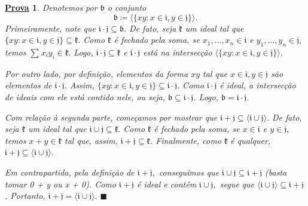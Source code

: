 \documentclass{article}
\newtheorem*{proof*}{\underline{Prova}}
\renewcommand\qedsymbol{$\blacksquare$}
\begin{document}
\begin{proof*}
  Denotemos por \(\mathfrak{b}\) o conjunto 
  \[
    \mathfrak{b}\coloneqq \langle \{xy:x\in \mathfrak{i}, y\in \mathfrak{j}\} \rangle.
  \]
  Primeiramente, note que \(\mathfrak{i}\cdot \mathfrak{j}\subseteq{\mathfrak{b}}.\) De fato, seja \(\mathfrak{k}\) um ideal tal que \(\{xy:x\in \mathfrak{i}, y\in \mathfrak{j}\}\subseteq{\mathfrak{k}}.\)
  Como \(\mathfrak{k}\) é fechado pela soma, se \(x_{1}, \dotsc, x_{n}\in \mathfrak{i}\) e \(y_{1},\dotsc,y_{n}\in \mathfrak{j},\) temos  
  \(\sum\limits_{}^{}x_{i}y_{i}\in \mathfrak{k}.\) Logo, \(\mathfrak{i}\cdot \mathfrak{j}\subseteq{\mathfrak{k}}\) e \(\mathfrak{i}\cdot \mathfrak{j}\) está
  na intersecção \(\langle \{xy: x\in \mathfrak{i}, y\in \mathfrak{j}\} \rangle.\)

  Por outro lado, por definição, elementos da forma \(xy\) tal que \(x\in \mathfrak{i}, y\in \mathfrak{j}\) são elementos
  de \(\mathfrak{i}\cdot \mathfrak{j}.\) Assim, \(\{xy:x\in \mathfrak{i}, y\in \mathfrak{j}\}\subseteq{\mathfrak{i}\cdot \mathfrak{j}}.\) Como
  \(\mathfrak{i}\cdot \mathfrak{j}\) é ideal, a intersecção de ideais com ele está contido nele, ou seja, \(\mathfrak{b}\subseteq{\mathfrak{i}\cdot \mathfrak{j}}\).
  Logo, \(\mathfrak{b} = \mathfrak{i}\cdot \mathfrak{j}.\)

  Com relação à segunda parte, começamos por mostrar que \(\mathfrak{i}+\mathfrak{j}\subseteq{\langle \mathfrak{i}\cup \mathfrak{j} \rangle}.\) De fato,
  seja \(\mathfrak{k}\) um ideal tal que \(\mathfrak{i}\cup \mathfrak{j}\subseteq{\mathfrak{k}}.\) Como \(\mathfrak{k}\) é fechado pela soma,
  se \(x\in \mathfrak{i}\) e \(y\in \mathfrak{j},\) temos \(x+y\in \mathfrak{k}\) tal que, assim, \(\mathfrak{i} + \mathfrak{j}\subseteq{\mathfrak{k}}\).
  Finalmente, como \(\mathfrak{k}\) é qualquer, \(\mathfrak{i}+\mathfrak{j}\subseteq{\langle \mathfrak{i}\cup \mathfrak{j} \rangle}.\)

  Em contrapartida, pela definição de \(\mathfrak{i} + \mathfrak{j},\) conseguimos 
  que \(\mathfrak{i}\cup \mathfrak{j}\subseteq{\mathfrak{i}+\mathfrak{j}}\) (basta tomar 0 + y ou x + 0).
  Como \(\mathfrak{i} + \mathfrak{j}\) é ideal e contém \(\mathfrak{i}\cup \mathfrak{j},\) segue que \(\langle \mathfrak{i}\cup \mathfrak{j} \rangle\subseteq{\mathfrak{i}+\mathfrak{j}}\).
  Portanto, \(\mathfrak{i}+\mathfrak{j} = \langle \mathfrak{i}\cup \mathfrak{j} \rangle.\) \qedsymbol
\end{proof*}
\end{document}
